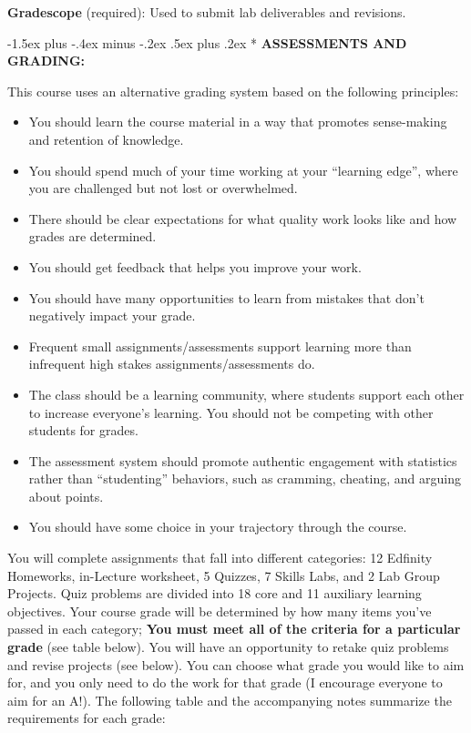 \documentclass[11pt]{article}
\makeatletter
\renewcommand\section{\@startsection{section}{1}{0pt}%
  {-1.5ex plus -.4ex minus -.2ex}%
  {.5ex plus .2ex}%
  {\normalfont\Large\bfseries}}
\makeatother
\begin{document}
\textbf{Gradescope} (required): Used to submit lab deliverables and revisions.

\section*{}
\textbf{ASSESSMENTS AND GRADING:}

This course uses an alternative grading system based on the following principles:

\begin{samepage}
\begin{itemize}
\item You should learn the course material in a way that promotes sense-making and retention of knowledge.
\item You should spend much of your time working at your ``learning edge'', where you are challenged but not lost or overwhelmed.
\item There should be clear expectations for what quality work looks like and how grades are determined.
\item You should get feedback that helps you improve your work.
\item You should have many opportunities to learn from mistakes that don’t negatively impact your grade.
\item Frequent small assignments/assessments support learning more than infrequent high stakes assignments/assessments do.
\item The class should be a learning community, where students support each other to increase everyone’s learning. You should not be competing with other students for grades.
\item The assessment system should promote authentic engagement with statistics rather than “studenting” behaviors, such as cramming, cheating, and arguing about points.
\item You should have some choice in your trajectory through the course.
\end{itemize}
\end{samepage}

You will complete assignments that fall into different categories: 12 Edfinity Homeworks, in-Lecture worksheet, 5 Quizzes, 7 Skills Labs, and 2 Lab Group Projects. Quiz problems are divided into 18 core and 11 auxiliary learning objectives. Your course grade will be determined by how many items you’ve passed in each category; \textbf{You must meet all of the criteria for a particular grade} (see table below). You will have an opportunity to retake quiz problems and revise projects (see below). You can choose what grade you would like to aim for, and you only need to do the work for that grade (I encourage everyone to aim for an A!). The following table and the accompanying notes summarize the requirements for each grade:
\end{document}
